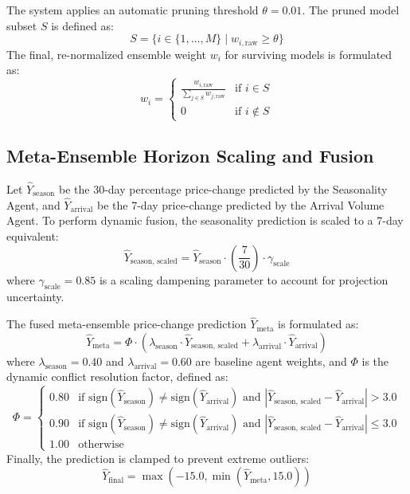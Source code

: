\documentclass[12pt,a4paper]{report}
\theoremstyle{definition}
\theoremstyle{remark}
\begin{document}
The system applies an automatic pruning threshold $\theta = 0.01$. The pruned model subset $S$ is defined as:
\begin{equation}
    S = \{ i \in \{1, \dots, M\} \mid w_{i,\text{raw}} \geq \theta \}
\end{equation}
The final, re-normalized ensemble weight $w_i$ for surviving models is formulated as:
\begin{equation}
    w_i = \begin{cases}
        \frac{w_{i,\text{raw}}}{\sum_{j \in S} w_{j,\text{raw}}} & \text{if } i \in S \\
        0 & \text{if } i \notin S
    \end{cases}
\end{equation}

\subsection{Meta-Ensemble Horizon Scaling and Fusion}

Let $\hat{Y}_{\text{season}}$ be the 30-day percentage price-change predicted by the Seasonality Agent, and $\hat{Y}_{\text{arrival}}$ be the 7-day price-change predicted by the Arrival Volume Agent. To perform dynamic fusion, the seasonality prediction is scaled to a 7-day equivalent:
\begin{equation}
    \hat{Y}_{\text{season, scaled}} = \hat{Y}_{\text{season}} \cdot \left( \frac{7}{30} \right) \cdot \gamma_{\text{scale}}
\end{equation}
where $\gamma_{\text{scale}} = 0.85$ is a scaling dampening parameter to account for projection uncertainty.

The fused meta-ensemble price-change prediction $\hat{Y}_{\text{meta}}$ is formulated as:
\begin{equation}
    \hat{Y}_{\text{meta}} = \Phi \cdot \left( \lambda_{\text{season}} \cdot \hat{Y}_{\text{season, scaled}} + \lambda_{\text{arrival}} \cdot \hat{Y}_{\text{arrival}} \right)
\end{equation}
where $\lambda_{\text{season}} = 0.40$ and $\lambda_{\text{arrival}} = 0.60$ are baseline agent weights, and $\Phi$ is the dynamic conflict resolution factor, defined as:
\begin{equation}
    \Phi = \begin{cases}
        0.80 & \text{if } \text{sign}(\hat{Y}_{\text{season}}) \neq \text{sign}(\hat{Y}_{\text{arrival}}) \text{ and } \left| \hat{Y}_{\text{season, scaled}} - \hat{Y}_{\text{arrival}} \right| > 3.0 \\
        0.90 & \text{if } \text{sign}(\hat{Y}_{\text{season}}) \neq \text{sign}(\hat{Y}_{\text{arrival}}) \text{ and } \left| \hat{Y}_{\text{season, scaled}} - \hat{Y}_{\text{arrival}} \right| \leq 3.0 \\
        1.00 & \text{otherwise}
    \end{cases}
\end{equation}
Finally, the prediction is clamped to prevent extreme outliers:
\begin{equation}
    \hat{Y}_{\text{final}} = \max\left( -15.0, \min\left( \hat{Y}_{\text{meta}}, 15.0 \right) \right)
\end{equation}
\end{document}
